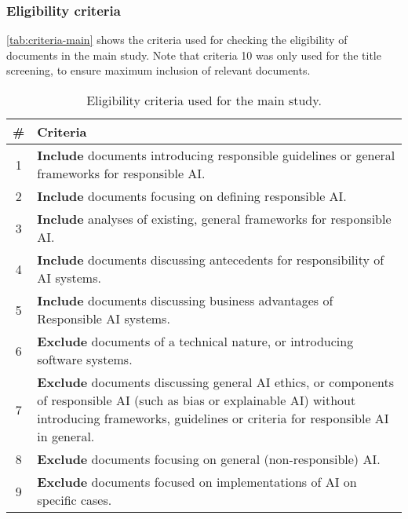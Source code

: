 \subsubsection{Eligibility criteria}
\autoref{tab:criteria-main} shows the criteria used for checking the eligibility of documents in the main study. Note that criteria 10 was only used for the title screening, to ensure maximum inclusion of relevant documents.

\begin{table}[htp]
    \centering
    \caption{Eligibility criteria used for the main study.}
    \label{tab:criteria-main}
    \begin{threeparttable}
    \begin{tabular}{cp{}}
    \toprule
        \textbf{\#} & \textbf{Criteria} \\
    \midrule
        1 & \textbf{Include} documents introducing responsible guidelines or general frameworks for responsible AI. \\
        2 & \textbf{Include} documents focusing on defining responsible AI. \\
        3 & \textbf{Include} analyses of existing, general frameworks for responsible AI. \\
        4 & \textbf{Include} documents discussing antecedents for responsibility of AI systems. \\
        5 & \textbf{Include} documents discussing business advantages of Responsible AI systems. \\
        \midrule
        6 & \textbf{Exclude} documents of a technical nature, or introducing software systems. \\ %
        7 & \textbf{Exclude} documents discussing general AI ethics, or components of responsible AI (such as bias or explainable AI) without introducing frameworks, guidelines or criteria for responsible AI in general. \\
        8 & \textbf{Exclude} documents focusing on general (non-responsible) AI. \\ %
        9 & \textbf{Exclude} documents focused on implementations of AI on specific cases. \\ %

\end{tabular}
\end{threeparttable}
\end{table}
